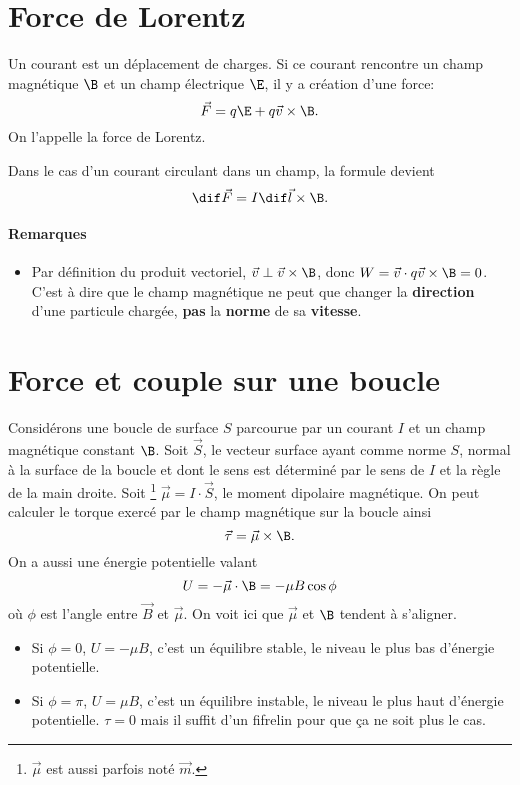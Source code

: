 \section{Force de Lorentz}
\label{sec:lorentz}
Un courant est un déplacement de charges.
Si ce courant rencontre un champ magnétique $\B$ et un champ électrique $\E$,
il y a création d'une force:
\[ \vec F = q \E + q \vec v \times \B. \]
On l'appelle la force de Lorentz.

Dans le cas d'un courant circulant dans un champ, la formule devient
\[ \dif \vec F = I\dif \vec l \times \B. \]

\paragraph{Remarques}
\begin{itemize}
  \item Par définition du produit vectoriel, $\vec v \perp \vec v \times \B$,
    donc $W = \vec v \cdot q\vec v \times \B = 0$.
    C'est à dire que le champ magnétique ne peut que changer
    la \textbf{direction} d'une particule chargée,
    \textbf{pas} la \textbf{norme} de sa \textbf{vitesse}.
\end{itemize}

\section{Force et couple sur une boucle}
Considérons une boucle de surface $S$ parcourue par un courant $I$
et un champ magnétique constant $\B$.
Soit $\vec S$, le vecteur surface ayant comme norme $S$,
normal à la surface de la boucle et dont le sens est déterminé
par le sens de $I$ et la règle de la main droite.
Soit
\footnote{$\vec \mu$ est aussi parfois noté $\vec m$.}
$\vec \mu = I \cdot \vec S$,
le moment dipolaire magnétique.
On peut calculer le torque exercé par le champ magnétique sur la boucle ainsi
\[ \vec \tau = \vec \mu \times \B. \]
On a aussi une énergie potentielle valant
\[ U = -\vec \mu \cdot \B = -\mu B \cos \phi \]
où $\phi$ est l'angle entre $\vec{B}$ et $\vec{\mu}$.
On voit ici que $\vec \mu$ et $\B$ tendent à s'aligner.
\begin{itemize}
  \item Si $\phi = 0$, $U = - \mu B$, c'est un équilibre stable,
    le niveau le plus bas d'énergie potentielle.
  \item Si $\phi = \pi$, $U = \mu B$, c'est un équilibre instable,
    le niveau le plus haut d'énergie potentielle.
    $\tau = 0$ mais il suffit d'un fifrelin pour que ça ne soit plus le cas.
\end{itemize}

